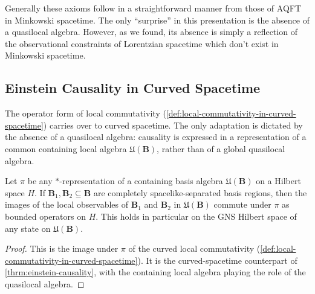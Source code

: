 Generally these axioms follow in a straightforward manner from those of AQFT in Minkowski spacetime. The only ``surprise'' in this presentation is the absence of a quasilocal algebra. However, as we found, its absence is simply a reflection of the observational constraints of Lorentzian spacetime which don't exist in Minkowski spacetime.

\subsection{Einstein Causality in Curved Spacetime}

The operator form of local commutativity (\ref{def:local-commutativity-in-curved-spacetime}) carries over to curved spacetime. The only adaptation is dictated by the absence of a quasilocal algebra: causality is expressed in a representation of a common containing local algebra $\mathfrak{U}(\mathbf{B})$, rather than of a global quasilocal algebra.

\begin{theorem}
    \label{thrm:einstein-causality-in-curved-spacetime}
    \leanok
    Let $\pi$ be any $*$-representation of a containing basis algebra $\mathfrak{U}(\mathbf{B})$ on a Hilbert space $H$. If $\mathbf{B}_1, \mathbf{B}_2 \subseteq \mathbf{B}$ are completely spacelike-separated basis regions, then the images of the local observables of $\mathbf{B}_1$ and $\mathbf{B}_2$ in $\mathfrak{U}(\mathbf{B})$ commute under $\pi$ as bounded operators on $H$. This holds in particular on the GNS Hilbert space of any state on $\mathfrak{U}(\mathbf{B})$.
\end{theorem}
\begin{proof}
    \leanok
    This is the image under $\pi$ of the curved local commutativity (\ref{def:local-commutativity-in-curved-spacetime}). It is the curved-spacetime counterpart of \ref{thrm:einstein-causality}, with the containing local algebra playing the role of the quasilocal algebra.
\end{proof}


